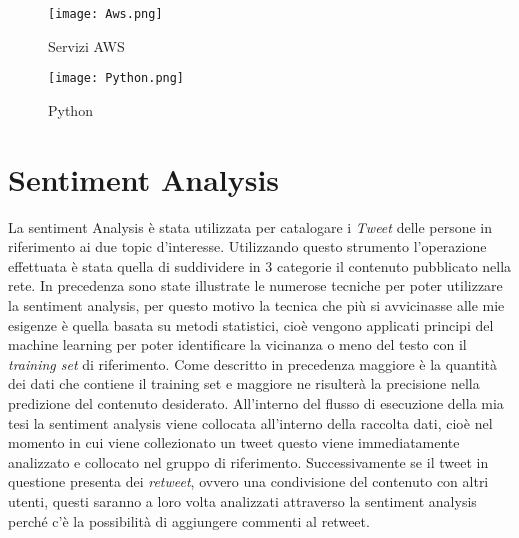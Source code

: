\begin{figure}[htbp]
\centering
\begin{minipage}[c]{.40\textwidth}
\centering\setlength{\captionmargin}{0pt}%
\texttt{[image: Aws.png]}
\caption{Servizi AWS}
\end{minipage}%
\hspace{10mm}%
\begin{minipage}[c]{.40\textwidth}
\centering\setlength{\captionmargin}{0pt}%
\texttt{[image: Python.png]}
\caption{Python}
\end{minipage}
\end{figure}

\section{Sentiment Analysis}
La sentiment Analysis è stata utilizzata per catalogare i \textit{Tweet} delle persone in riferimento ai due topic d'interesse. 
Utilizzando questo strumento l'operazione effettuata è stata quella di suddividere in 3 categorie il contenuto pubblicato nella rete. In precedenza sono state illustrate le numerose tecniche per poter utilizzare la sentiment analysis, per questo motivo la tecnica che più si avvicinasse alle mie esigenze è quella basata su metodi statistici, cioè vengono applicati principi del machine learning per poter identificare la vicinanza o meno del testo con il \textit{training set} di riferimento.\cite{Bayes}
Come descritto in precedenza maggiore è la quantità dei dati che contiene il training set e maggiore ne risulterà la precisione nella predizione del contenuto desiderato.
All'interno del flusso di esecuzione della mia tesi la sentiment analysis viene collocata all'interno della raccolta dati, cioè nel momento in cui viene collezionato un tweet questo viene immediatamente analizzato e collocato nel gruppo di riferimento.
Successivamente se il tweet in questione presenta dei \textit{retweet}, ovvero una condivisione del contenuto con altri utenti, questi saranno a loro volta analizzati attraverso la sentiment analysis perché c'è la possibilità di aggiungere commenti al retweet.


